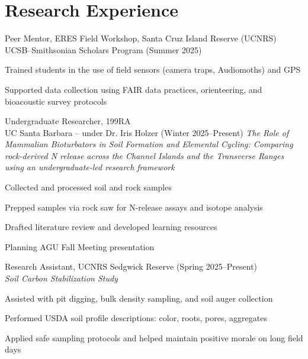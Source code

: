 \documentclass[letterpaper]{article}
\renewenvironment{itemize}{
  \begin{list}{}{
    \setlength{\leftmargin}{1.5em}
  }
}{
  \end{list}
}
\newenvironment{biblist}{%
   \begin{list}{}{%
     \setlength{\labelwidth}{0pt}%
     \setlength{\labelsep}{1em}%
     \setlength{\leftmargin}{2em}%
     \setlength{\itemindent}{-1em}%
   }
}{\end{list}}
\begin{document}
\section*{Research Experience}

\begin{biblist}
\item Peer Mentor, ERES Field Workshop, Santa Cruz Island Reserve (UCNRS) \\
UCSB–Smithsonian Scholars Program (Summer 2025)  
\begin{itemize}
  \item Trained students in the use of field sensors (camera traps, Audiomoths) and GPS
  \item Supported data collection using FAIR data practices, orienteering, and bioacoustic survey protocols
\end{itemize}

\item Undergraduate Researcher, 199RA \\
UC Santa Barbara – under Dr. Iris Holzer (Winter 2025–Present)  
\emph{The Role of Mammalian Bioturbators in Soil Formation and Elemental Cycling: Comparing rock-derived N release across the Channel Islands and the Transverse Ranges using an undergraduate-led research framework}  
\begin{itemize}
  \item Collected and processed soil and rock samples
  \item Prepped samples via rock saw for N-release assays and isotope analysis
  \item Drafted literature review and developed learning resources
  \item Planning AGU Fall Meeting presentation
\end{itemize}

\item Research Assistant, UCNRS Sedgwick Reserve (Spring 2025–Present) \\
\emph{Soil Carbon Stabilization Study}  
\begin{itemize}
  \item Assisted with pit digging, bulk density sampling, and soil auger collection
  \item Performed USDA soil profile descriptions: color, roots, pores, aggregates
  \item Applied safe sampling protocols and helped maintain positive morale on long field days
\end{itemize}


\end{biblist}
\end{document}
